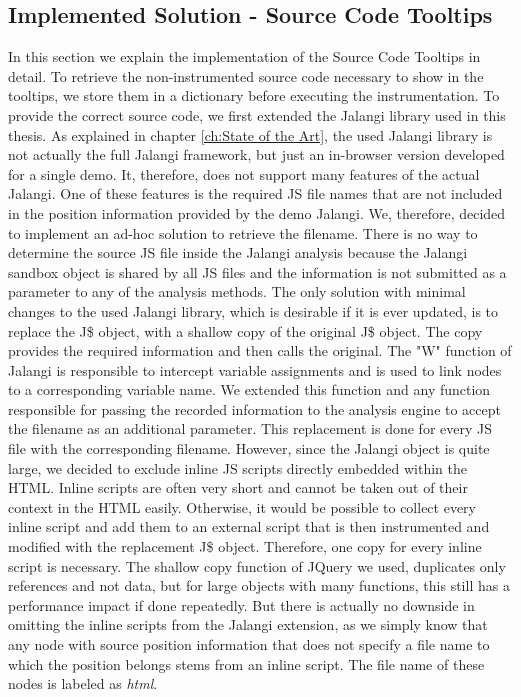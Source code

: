 \subsection{Implemented Solution - Source Code Tooltips}
In this section we explain the implementation of the Source Code Tooltips in detail. To retrieve the non-instrumented source code necessary to show in the tooltips, we store them in a dictionary before executing the instrumentation. To provide the correct source code, we first extended the Jalangi library used in this thesis. As explained in chapter \ref{ch:State of the Art}, the used Jalangi library is not actually the full Jalangi framework, but just an in-browser version developed for a single demo. It, therefore, does not support many features of the actual Jalangi. One of these features is the required JS file names that are not included in the position information provided by the demo Jalangi. We, therefore, decided to implement an ad-hoc solution to retrieve the filename. There is no way to determine the source JS file inside the Jalangi analysis because the Jalangi sandbox object is shared by all JS files and the information is not submitted as a parameter to any of the analysis methods. The only solution with minimal changes to the used Jalangi library, which is desirable if it is ever updated, is to replace the J\$ object, with a shallow copy of the original J\$ object. The copy provides the required information and then calls the original. The "W" function of Jalangi is responsible to intercept variable assignments and is used to link nodes to a corresponding variable name. We extended this function and any function responsible for passing the recorded information to the analysis engine to accept the filename as an additional parameter. This replacement is done for every JS file with the corresponding filename. However, since the Jalangi object is quite large, we decided to exclude inline JS scripts directly embedded within the HTML. Inline scripts are often very short and cannot be taken out of their context in the HTML easily. Otherwise, it would be possible to collect every inline script and add them to an external script that is then instrumented and modified with the replacement J\$ object. Therefore, one copy for every inline script is necessary. The shallow copy function of JQuery we used, duplicates only references and not data, but for large objects with many functions, this still has a performance impact if done repeatedly.%
 But there is actually no downside in omitting the inline scripts from the Jalangi extension, as we simply know that any node with source position information that does not specify a file name to which the position belongs stems from an inline script. The file name of these nodes is labeled as \emph{html}.\\
